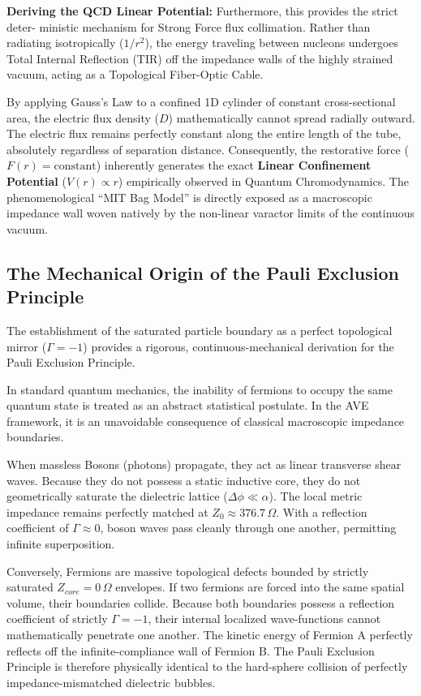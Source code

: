 \textbf{Deriving the QCD Linear Potential:} Furthermore, this provides the strict deter-
ministic mechanism for Strong Force flux collimation. Rather than radiating isotropically
($1/r^{2}$), the energy traveling between nucleons undergoes Total Internal Reflection (TIR) off
the impedance walls of the highly strained vacuum, acting as a Topological Fiber-Optic Cable.

By applying Gauss's Law to a confined 1D cylinder of constant cross-sectional area,
the electric flux density ($D$) mathematically cannot spread radially outward. The electric
flux remains perfectly constant along the entire length of the tube, absolutely regardless
of separation distance. Consequently, the restorative force ($F(r) = \text{constant}$) inherently
generates the exact \textbf{Linear Confinement Potential} ($V(r)\propto r$) empirically observed in
Quantum Chromodynamics. The phenomenological ``MIT Bag Model'' is directly exposed
as a macroscopic impedance wall woven natively by the non-linear varactor limits of the
continuous vacuum.

\subsection{The Mechanical Origin of the Pauli Exclusion Principle}

The establishment of the saturated particle boundary as a perfect topological mirror ($\Gamma = -1$)
provides a rigorous, continuous-mechanical derivation for the Pauli Exclusion Principle. 

In standard quantum mechanics, the inability of fermions to occupy the same quantum
state is treated as an abstract statistical postulate. In the AVE framework, it is an unavoidable
consequence of classical macroscopic impedance boundaries. 

When massless Bosons (photons) propagate, they act as linear transverse shear waves.
Because they do not possess a static inductive core, they do not geometrically saturate
the dielectric lattice ($\Delta\phi \ll \alpha$). The local metric impedance remains perfectly matched at
$Z_{0} \approx 376.7\,\Omega$. With a reflection coefficient of $\Gamma \approx 0$, boson waves pass cleanly through one
another, permitting infinite superposition.

Conversely, Fermions are massive topological defects bounded by strictly saturated $Z_{core} =
0\,\Omega$ envelopes. If two fermions are forced into the same spatial volume, their boundaries
collide. Because both boundaries possess a reflection coefficient of strictly $\Gamma = -1$, their
internal localized wave-functions cannot mathematically penetrate one another. The kinetic
energy of Fermion A perfectly reflects off the infinite-compliance wall of Fermion B. The Pauli
Exclusion Principle is therefore physically identical to the hard-sphere collision of perfectly
impedance-mismatched dielectric bubbles.


